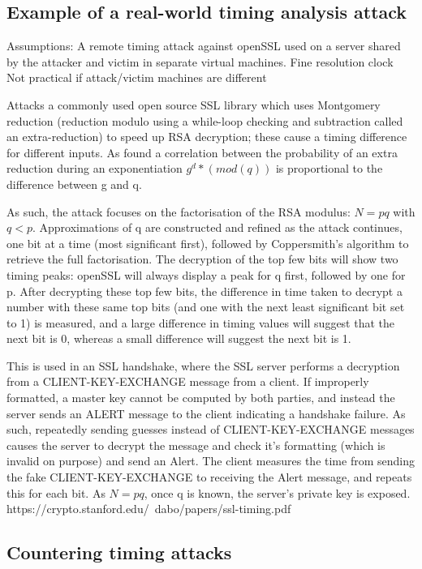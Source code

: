 \documentclass[british,11pt,a4paper]{article}
\begin{document}
\subsection{Example of a real-world timing analysis attack}
\cite{Brumley2005-ez}
Assumptions:
 A remote timing attack against openSSL used on a server shared by the attacker and victim in separate virtual machines.
 Fine resolution clock
 Not practical if attack/victim machines are different


Attacks a commonly used open source SSL library which uses Montgomery reduction (reduction modulo using a while-loop checking and subtraction called an extra-reduction) to speed up RSA decryption; these cause a timing difference for different inputs. As \citeauthor{Brumley2005-ez} found a correlation between the probability of an extra reduction during an exponentiation \(g^d * (mod (q))\) is proportional to the difference between g and q.

As such, the attack focuses on the factorisation of the RSA modulus: $N = pq$ with $q<p$. Approximations of q are constructed and refined as the attack continues, one bit at a time (most significant first), followed by Coppersmith's algorithm to retrieve the full factorisation. 
The decryption of the top few bits will show two timing peaks: openSSL will always display a peak for q first, followed by one for p. After decrypting these top few bits, the difference in time taken to decrypt a number with these same top bits (and one with the next least significant bit set to 1) is measured, and a large difference in timing values will suggest that the next bit is 0, whereas a small difference will suggest the next bit is 1.

This is used in an SSL handshake, where the SSL server performs a decryption from a CLIENT-KEY-EXCHANGE message from a client. If improperly formatted, a master key cannot be computed by both parties, and instead the server sends an ALERT message to the client indicating a handshake failure. As such, repeatedly sending guesses instead of CLIENT-KEY-EXCHANGE messages causes the server to decrypt the message and check it's formatting (which is invalid on purpose) and send an Alert. The client measures the time from sending the fake CLIENT-KEY-EXCHANGE to receiving the Alert message, and repeats this for each bit. As $N=pq$, once q is known, the server's private key is exposed.
https://crypto.stanford.edu/~dabo/papers/ssl-timing.pdf

\subsection{Countering timing attacks}
\end{document}
